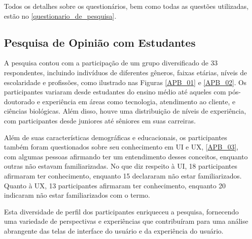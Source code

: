Todos os detalhes sobre os questionários, bem como todas as questões utilizadas, estão no \autoref{questionario_de_pesquisa}.



\subsection{Pesquisa de Opinião com Estudantes}
\label{Pesquisa_de_Opinião_com_Estudantes}

A pesquisa contou com a participação de um grupo diversificado de 33 respondentes, incluindo indivíduos de diferentes gêneros, faixas etárias, níveis de escolaridade e profissões, como ilustrado nas Figuras \ref{APB_01} e \ref{APB_02}. Os participantes variaram desde estudantes do ensino médio até aqueles com pós-doutorado e experiência em áreas como tecnologia, atendimento ao cliente, e ciências biológicas. Além disso, houve uma distribuição de níveis de experiência, com participantes desde juniores até sêniores em suas carreiras.

Além de suas características demográficas e educacionais, os participantes também foram questionados sobre seu conhecimento em \ac{UI} e \ac{UX}, \autoref{APB_03}, com algumas pessoas afirmando ter um entendimento desses conceitos, enquanto outras não estavam familiarizadas. No que diz respeito à \ac{UI}, 18 participantes afirmaram ter conhecimento, enquanto 15 declararam não estar familiarizados. Quanto à \ac{UX}, 13 participantes afirmaram ter conhecimento, enquanto 20 indicaram não estar familiarizados com o termo.

Esta diversidade de perfil dos participantes enriqueceu a pesquisa, fornecendo uma variedade de perspectivas e experiências que contribuíram para uma análise abrangente das telas de interface do usuário e da experiência do usuário. 

